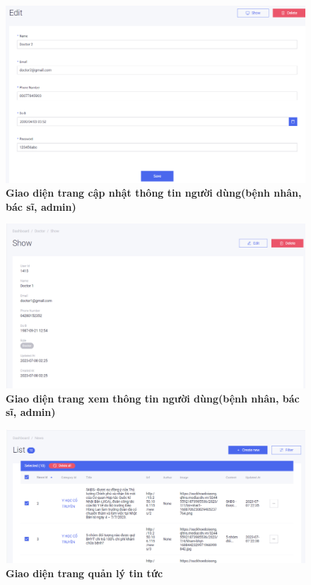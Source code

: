 \begin{figure}[H]
  \centering
  \includegraphics[scale=0.5]{Images/server/webUI/user_edit.PNG}
  \caption[Giao diện trang cập nhật thông tin người dùng(bệnh nhân, bác sĩ, admin)]{\bfseries \fontsize{12pt}{0pt}\selectfont Giao diện trang cập nhật thông tin người dùng(bệnh nhân, bác sĩ, admin)}
  \label{user_edit} %
\end{figure}


\begin{figure}[H]
  \centering
  \includegraphics[scale=0.5]{Images/server/webUI/doctor_show.PNG}
  \caption[Giao diện trang xem thông tin người dùng(bệnh nhân, bác sĩ, admin)]{\bfseries \fontsize{12pt}{0pt}\selectfont Giao diện trang xem thông tin người dùng(bệnh nhân, bác sĩ, admin)}
  \label{user_edit} %
\end{figure}



\begin{figure}[H]
  \centering
  \includegraphics[scale=0.5]{Images/server/webUI/news_list.PNG}
  \caption[Giao diện trang quản lý tin tức]{\bfseries \fontsize{12pt}{0pt}\selectfont Giao diện trang quản lý tin tức}
  \label{news_list} %
\end{figure}

